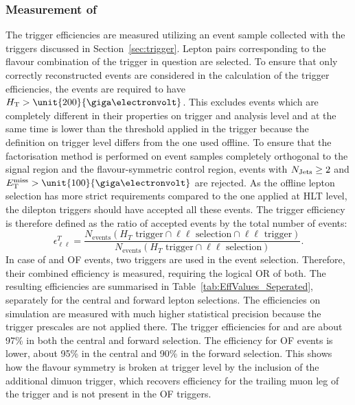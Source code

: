\subsubsection{Measurement of \RT}
\label{sec:triggerEffs}
The trigger efficiencies are measured utilizing an event sample collected with the \HT triggers discussed in Section~\ref{sec:trigger}. Lepton pairs corresponding to the flavour combination of the trigger in question are selected. To ensure that only correctly reconstructed events are considered in the calculation of the trigger efficiencies, the events are required to have $\HT > \unit{200}{\giga\electronvolt}$. This excludes events which are completely different in their properties on trigger and analysis level and at the same time is lower than the threshold applied in the trigger because the \HT definition on trigger level differs from the one used offline. To ensure that the factorisation method is performed on event samples completely orthogonal to the signal region and the flavour-symmetric control region, events with $N_\text{Jets} \geq 2$ and $\MET > \unit{100}{\giga\electronvolt}$ are rejected. As the offline lepton selection has more strict requirements compared to the one applied at HLT level, the dilepton triggers should have accepted all these events. The trigger efficiency is therefore defined as the ratio of accepted events by the total number of events:
\begin{equation*}
\epsilon_{\ell\ell}^T = \frac{N_{\text{events}}(H_T\text{ trigger} \cap \ell\ell\text{ selection} \cap \ell\ell\text{ trigger})}{N_{\text{events}}(H_T\text{ trigger} \cap \ell\ell\text{ selection})}.
\end{equation*}
In case of \MM and OF events, two triggers are used in the event selection. Therefore, their combined efficiency is measured, requiring the logical OR of both. The resulting efficiencies are summarised in Table~\ref{tab:EffValues_Seperated}, separately for the central and forward lepton selections. The efficiencies on simulation are measured with much higher statistical precision because the trigger prescales are not applied there. The trigger efficiencies for \EE and \MM are about 97\% in both the central and forward selection. The efficiency for OF events is lower, about 95\% in the central and 90\% in the forward selection. This shows how the flavour symmetry is broken at trigger level by the inclusion of the additional dimuon trigger, which recovers efficiency for the trailing muon leg of the trigger and is not present in the OF triggers.   

